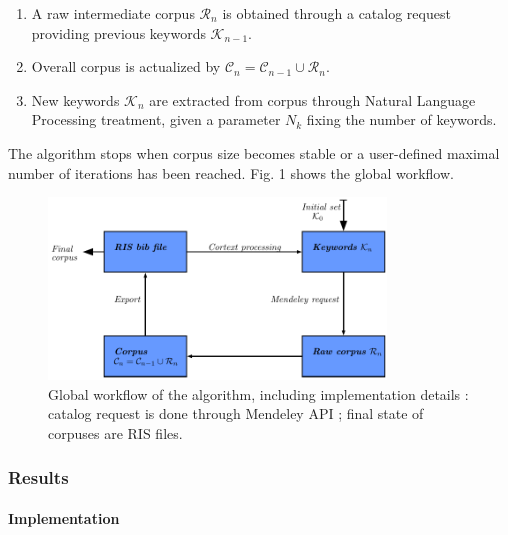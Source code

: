 \begin{enumerate}
\item A raw intermediate corpus $\mathcal{R}_n$ is obtained through a catalog request providing previous keywords $\mathcal{K}_{n-1}$.
\item Overall corpus is actualized by $\mathcal{C}_n = \mathcal{C}_{n-1} \cup \mathcal{R}_n$.
\item New keywords $\mathcal{K}_n$ are extracted from corpus through Natural Language Processing treatment, given a parameter $N_k$ fixing the number of keywords.
\end{enumerate}

The algorithm stops when corpus size becomes stable or a user-defined maximal number of iterations has been reached. Fig. 1 shows the global workflow.


\begin{figure}
\centering
\includegraphics[width=0.8\textwidth]{Figures/PartI/QuantitativeEpistemo/schema_algo}
\caption{Global workflow of the algorithm, including implementation details : catalog request is done through Mendeley API ; final state of corpuses are RIS files.}
\label{fig:quantepistemo:algo}
\end{figure}




\subsubsection{Results}

\paragraph{Implementation}

